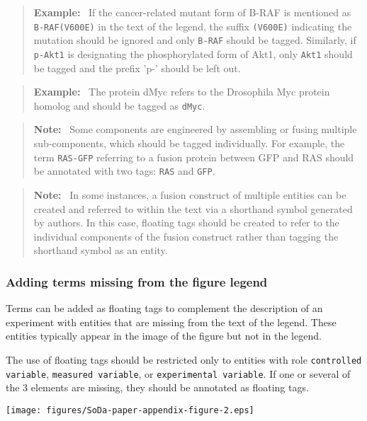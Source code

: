 \documentclass{bioinfo}
\newenvironment{note}
{\par\color{black}\begin{quote}\textbf{Note:}\ }
{\end{quote}\par}
\newenvironment{example}
{\par\color{black}\begin{quote}\textbf{Example:}\ }
{\end{quote}\par}
\begin{document}
\begin{example}
    If the cancer-related mutant form of B-RAF is mentioned as \texttt{B-RAF(V600E)} in the text of the legend, the suffix \texttt{(V600E)} indicating the mutation should be ignored and only \texttt{B-RAF} should be tagged. Similarly, if \texttt{p-Akt1} is designating the phosphorylated form of Akt1, only \texttt{Akt1} should be tagged and the prefix 'p-' should be left out.
\end{example}

\begin{example}
    The protein dMyc refers to the Drosophila Myc protein homolog and should be tagged as \texttt{dMyc}.
\end{example}

\begin{note}
    Some components are engineered by assembling or fusing multiple sub-components, which should be tagged individually. For example, the term \texttt{RAS-GFP} referring to a fusion protein between GFP and RAS should be annotated with two tags: \texttt{RAS} and \texttt{GFP}.
\end{note}

\begin{note}
    In some instances, a fusion construct of multiple entities can be created and referred to within the text via a shorthand symbol generated by authors. In this case, floating tags should be created to refer to the individual components of the fusion construct rather than tagging the shorthand symbol as an entity.
\end{note}

\subsubsection{Adding terms missing from the figure legend}\label{app:adding-terms}

Terms can be added as floating tags to complement the description of an experiment with entities that are missing from the text of the legend. These entities typically appear in the image of the figure but not in the legend.

The use of floating tags should be restricted only to entities with role \texttt{controlled variable}, \texttt{measured variable}, or \texttt{experimental variable}. If one or several of the 3 elements are missing, they should be annotated as floating tags.

\begin{figure*}[ht]
    \centering
    \texttt{[image: figures/SoDa-paper-appendix-figure-2.eps]}
    \caption{Key elements missing in the figure caption should be added as a floating tag: in this example, the measured variable component AGO2 is missing and was added as a floating tag.}
    \label{fig:floating_tag}
\end{figure*}
\end{document}
